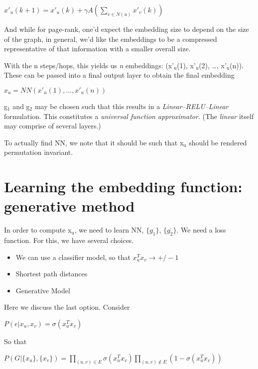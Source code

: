 \documentclass{article}
\begin{document}
\begin{center}
\(\displaystyle x'_u(k+1) = x'_u(k) + \gamma A \left(\sum_{v \in N(u)} x'_v(k) \right)\)
\end{center}

And while for page-rank, one'd expect the embedding size to depend on the size of the graph, in general, we'd like the embeddings to be a compressed representative of that information with a smaller overall size.

With the n steps/hops, this yields us \emph{n} embeddings: (x'\(_{\text{u}}\)(1), x'\(_{\text{u}}\)(2), \ldots{}, x'\(_{\text{u}}\)(n)). These can be passed into a final output layer to obtain the final embedding 

\begin{center}
\(x_u = NN(x'_u(1), ..., x'_u(n))\)
\end{center}

g\(_{\text{1}}\) and g\(_{\text{2}}\) may be chosen such that this results in a \emph{Linear--RELU--Linear} formulation. This constitutes a \emph{universal function approximator}. (The \emph{linear} itself may comprise of several layers.)

To actually find NN, we note that it should be such that x\(_{\text{u}}\) should be rendered permutation invariant.

\section{Learning the embedding function: generative method}
\label{sec:orga6edc01}

In order to compute x\(_{\text{u}}\), we need to learn NN, \(\{g_1^{\cdot}\}\), \(\{g_2^{\cdot}\}\). We need a loss function. For this, we have several choices.

\begin{itemize}
\item We can use a classifier model, so that \(x_u^T x_v \rightarrow +/- 1\)
\item Shortest path distances
\item Generative Model
\end{itemize}

Here we discuss the last option. Consider

\begin{center}
\(P(e | x_u, x_v) = \sigma(x_u^T x_v)\)
\end{center}

So that

\begin{center}
\(\displaystyle P(G | \{x_u\}, \{x_v\}) = \prod_{(u,v)\in E} \sigma(x_u^T x_v) \prod_{(u,v)\notin E} (1 - \sigma(x_u^T x_v))\)
\end{center}
\end{document}
